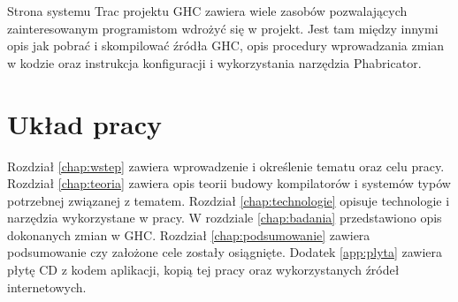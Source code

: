 Strona systemu Trac projektu GHC zawiera wiele zasobów pozwalających
zainteresowanym programistom wdrożyć się w projekt. Jest tam między innymi opis
jak pobrać i skompilować źródła GHC\cite{WikiNewcomers}, opis procedury
wprowadzania zmian w kodzie\cite{WikiFixingBugs} oraz instrukcja konfiguracji i
wykorzystania narzędzia Phabricator\cite{WikiPhabricator}.

\section{Układ pracy}\label{sec:uklad_pracy}

Rozdział \ref{chap:wstep} zawiera wprowadzenie i określenie tematu oraz celu
pracy. Rozdział \ref{chap:teoria} zawiera opis teorii budowy kompilatorów i
systemów typów potrzebnej związanej z tematem. Rozdział \ref{chap:technologie}
opisuje technologie i narzędzia wykorzystane w pracy. W rozdziale
\ref{chap:badania} przedstawiono opis dokonanych zmian w GHC. Rozdział
\ref{chap:podsumowanie} zawiera podsumowanie czy założone cele zostały
osiągnięte. Dodatek \ref{app:plyta} zawiera płytę CD z kodem aplikacji,
kopią tej pracy oraz wykorzystanych źródeł internetowych.
